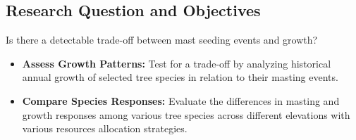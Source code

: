 \documentclass[11pt,letter]{article}
\begin{document}
\subsection{Research Question and Objectives}
Is there a detectable trade-off between mast seeding events and growth?
	\begin{itemize}
	\item \textbf{Assess Growth Patterns:} Test for a trade-off by analyzing historical annual growth of selected tree species in relation to their masting events.
	\item \textbf{Compare Species Responses:} Evaluate the differences in masting and growth responses among various tree species across different elevations with various resources allocation strategies.
	\end{itemize}
\end{document}

